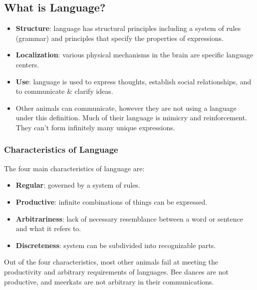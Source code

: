 \documentclass[]{article}
\begin{document}
		\subsection{What is Language?}
			\begin{itemize}
				\item \textbf{Structure}: language has structural principles including a system of rules (grammar) and principles that specify the properties of expressions.
				\item \textbf{Localization}: various physical mechanisms in the brain are specific language centers.
				\item \textbf{Use}: language is used to express thoughts, establish social relationships, and to communicate \& clarify ideas.
				\item Other animals can communicate, however they are not using a language under this definition. Much of their language is mimicry and reinforcement. They can't form infinitely many unique expressions.
			\end{itemize}

			\subsubsection{Characteristics of Language}
				The four main characteristics of language are:
				\begin{itemize}
					\item \textbf{Regular}: governed by a system of rules.
					\item \textbf{Productive}: infinite combinations of things can be expressed.
					\item \textbf{Arbitrariness}: lack of necessary resemblance between a word or sentence and what it refers to.
					\item \textbf{Discreteness}: system can be subdivided into recognizable parts.
				\end{itemize}
		
				Out of the four characteristics, most other animals fail at meeting the productivity and arbitrary requirements of languages. Bee dances are not productive, and meerkats are not arbitrary in their communications.
			
\end{document}
